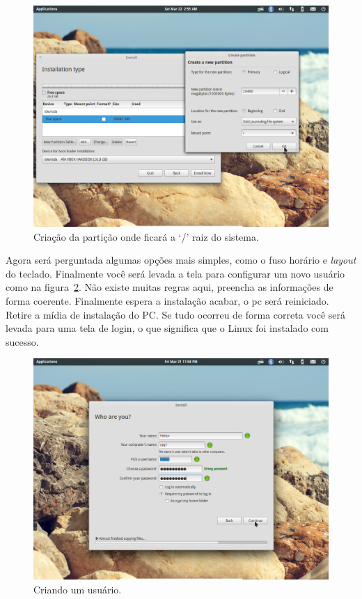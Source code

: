 \documentclass{handout_utfpr}
\begin{document}
\begin{figure}[H]
  \centering
  \includegraphics[scale=.3]{imagens/elementary-install-05.png}
  \caption{Criação da partição onde ficará a `/' raiz do sistema.}
  \label{fig:elementary-root}
\end{figure}

Agora será perguntada algumas opções mais simples, como o fuso horário e \emph{layout} do teclado. Finalmente você será levada a tela para configurar um novo usuário como na figura~\ref{fig:elementary-info}. Não existe muitas regras aqui, preencha as informações de forma coerente. Finalmente espera a instalação acabar, o pc será reiniciado. Retire a mídia de instalação do PC\@. Se tudo ocorreu de forma correta você será levada para uma tela de login, o que significa que o Linux foi instalado com sucesso.

\begin{figure}[H]
  \centering
  \includegraphics[scale=.3]{imagens/elementary-install-10.png}
  \caption{Criando um usuário.}
  \label{fig:elementary-info}
\end{figure}
\end{document}
